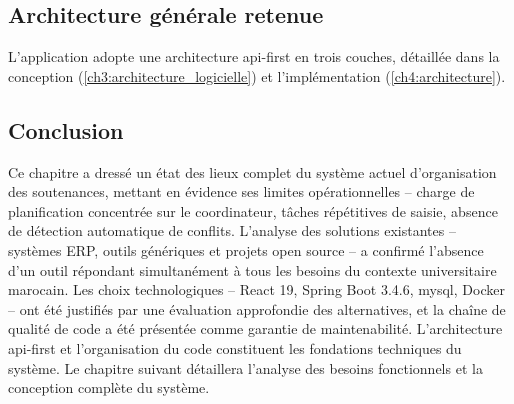 \subsection{Architecture générale retenue}
\label{ch2:architecture}

L'application adopte une architecture \acrshort{api}-first en trois couches, détaillée dans la conception (\cref{ch3:architecture_logicielle}) et l'implémentation (\cref{ch4:architecture}).

\subsection{Conclusion}
\label{ch2:conclusion}

Ce chapitre a dressé un état des lieux complet du système actuel d'organisation des soutenances, mettant en évidence ses limites opérationnelles -- charge de planification concentrée sur le coordinateur, tâches répétitives de saisie, absence de détection automatique de conflits. L'analyse des solutions existantes -- systèmes ERP, outils génériques et projets open source -- a confirmé l'absence d'un outil répondant simultanément à tous les besoins du contexte universitaire marocain. Les choix technologiques -- React 19, Spring Boot 3.4.6, \acrshort{mysql}, Docker -- ont été justifiés par une évaluation approfondie des alternatives, et la chaîne de qualité de code a été présentée comme garantie de maintenabilité. L'architecture \acrshort{api}-first et l'organisation du code constituent les fondations techniques du système. Le chapitre suivant détaillera l'analyse des besoins fonctionnels et la conception complète du système.
